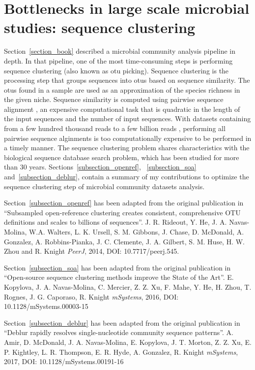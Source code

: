 \section{Bottlenecks in large scale microbial studies: sequence clustering}\label{section_bottlenecks}

Section~\ref{section_book} described a microbial community analysis pipeline in depth.
In that pipeline, one of the most time-consuming steps is performing
sequence clustering (also known as \gls{otu} picking). Sequence
clustering is the processing step that groups sequences into \gls{otu}s
based on sequence similarity. The \gls{otu}s found in a sample are used as an
approximation of the species richness in the given niche. Sequence similarity is
computed using pairwise sequence alignment \cite{Needleman1970, Smith1981}, an expensive
computational task that is quadratic in the length of the input sequences and
the number of input sequences. With
datasets containing from a few hundred thousand reads to a few billion
reads \cite{Goodwin2016}, performing all pairwise sequence alginments is too
computationally expensive to be performed in a timely manner. The sequence clustering
problem shares characteristics with the biological sequence database search problem,
which has been studied for more than 30 years. Sections~\ref{subsection_openref},
~\ref{subsection_soa} and~\ref{subsection_deblur}, contain a summary of my
contributions to optimize the sequence clustering step of microbial community
datasets analysis.

Section~\ref{subsection_openref} has been adapted from the original publication in
``Subsampled open-reference clustering creates consistent, comprehensive OTU
definitions and scales to billions of sequences''. J. R. Rideout, Y. He,
J. A. Navas-Molina, W.A. Walters, L. K. Ursell, S. M. Gibbons, J. Chase,
D. McDonald, A. Gonzalez, A. Robbins-Pianka, J. C. Clemente, J. A. Gilbert,
S. M. Huse, H. W. Zhou and R. Knight \emph{PeerJ}, 2014, DOI: 10.7717/peerj.545.

Section~\ref{subsection_soa} has been adapted from the original publication in
``Open-source sequence clustering methods improve the State of the Art''.
E. Kopylova, J. A. Navas-Molina, C. Mercier, Z. Z. Xu, F. Mahe, Y. He, H. Zhou,
T. Rognes, J. G. Caporaso, R. Knight \emph{mSystems}, 2016, DOI: 10.1128/mSystems.00003-15

Section~\ref{subsection_deblur} has been adapted from the original publication in
``Deblur rapidly resolves single-nucleotide community sequence patterns''.
A. Amir, D. McDonald, J. A. Navas-Molina, E. Kopylova, J. T. Morton, Z. Z. Xu,
E. P. Kightley, L. R. Thompson, E. R. Hyde, A. Gonzalez, R. Knight \emph{mSystems},
2017, DOI: 10.1128/mSystems.00191-16

